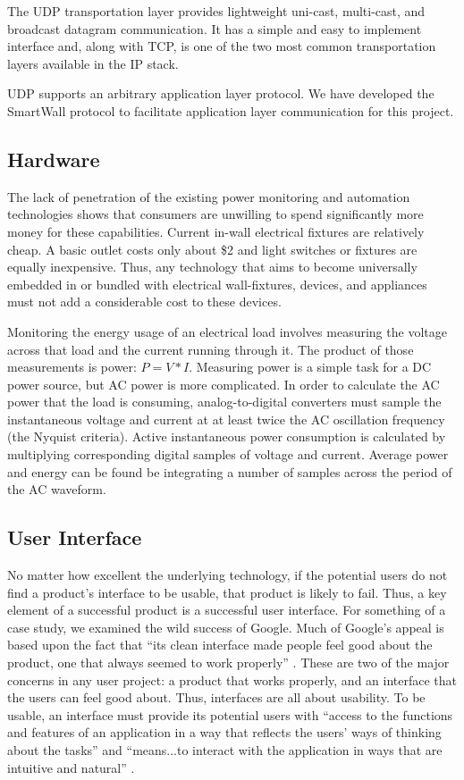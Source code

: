 \documentclass[11pt]{article}
\begin{document}
The UDP transportation layer provides lightweight uni-cast, multi-cast, and
broadcast datagram communication. It has a simple and easy to
implement interface and, along with TCP, is one of the two most common
transportation layers available in the IP stack.

UDP supports an arbitrary application layer protocol. We have
developed the SmartWall protocol to facilitate application layer
communication for this project.

\subsection{Hardware}
The lack of penetration of the existing power monitoring
and automation technologies shows that consumers are unwilling to
spend significantly more money for these capabilities.
Current in-wall electrical fixtures are relatively cheap. A basic outlet
costs only about \$2 and light switches or fixtures are equally
inexpensive. Thus, any technology that aims to become universally
embedded in or bundled with electrical wall-fixtures, devices, and
appliances must not add a considerable cost to these devices.

Monitoring the energy usage of an electrical load involves measuring
the voltage across that load and the current running through it. The
product of those measurements is power: $P = V*I$.  Measuring power is a
simple task for a DC power source, but AC power is more
complicated. In order to calculate the AC power that the load is
consuming, analog-to-digital converters must sample the instantaneous
voltage and current at at least twice the AC oscillation frequency
(the Nyquist criteria). Active instantaneous power consumption is
calculated by multiplying corresponding digital samples of voltage and
current. Average power and energy can be found be integrating a number of
samples across the period of the AC waveform.

\subsection{User Interface}
No matter how excellent the underlying technology, if the potential
users do not find a product’s interface to be usable, that product is
likely to fail. Thus, a key element of a successful product is a
successful user interface. For something of a case study, we examined the
wild success of Google. Much of Google's appeal is based upon the fact
that “its clean interface made people feel good about the product,
one that always seemed to work properly” \cite{googleStory}. These are
two of the major concerns in any user project: a product that works
properly, and an
interface that the users can feel good about. Thus, interfaces are
all about usability. To be usable, an interface must provide its
potential users with “access to the functions and features of an
application in a way that reflects the users’ ways of thinking about
the tasks” and “means...to interact with the application in ways that
are intuitive and natural” \cite{UIDesign}.
\end{document}
